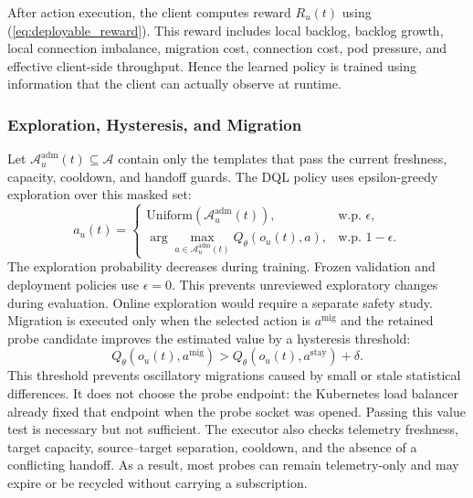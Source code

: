 \documentclass[manuscript]{acmart}
\begin{document}
After action execution, the client computes reward $R_u(t)$ using
(\ref{eq:deployable_reward}). This reward includes local backlog, backlog
growth, local connection imbalance, migration cost, connection cost, pod
pressure, and effective client-side throughput. Hence the learned policy is
trained using information that the client can actually observe at runtime.

\subsubsection{Exploration, Hysteresis, and Migration}

Let $\mathcal{A}^{\mathrm{adm}}_u(t)\subseteq\mathcal{A}$ contain only the templates
that pass the current freshness, capacity, cooldown, and handoff guards. The
DQL policy uses epsilon-greedy exploration over this masked set:
\begin{equation}
	a_u(t)=
	\begin{cases}
		\text{Uniform}(\mathcal{A}^{\mathrm{adm}}_u(t)), & \text{w.p. } \epsilon,\\
		\arg\max_{a\in\mathcal{A}^{\mathrm{adm}}_u(t)} Q_\theta(o_u(t),a), & \text{w.p. } 1-\epsilon.
	\end{cases}
\end{equation}
The exploration probability decreases during training. Frozen validation and
deployment policies use $\epsilon=0$. This prevents unreviewed exploratory
changes during evaluation. Online exploration would require a separate
safety study. Migration is
executed only when the selected action is $a^{\mathrm{mig}}$ and the retained probe
candidate improves the estimated value by a hysteresis threshold:
\begin{equation}
	Q_\theta(o_u(t),a^{\mathrm{mig}}) >
	Q_\theta(o_u(t),a^{\mathrm{stay}})+\delta.
\end{equation}
This threshold prevents oscillatory migrations caused by small or stale
statistical differences. It does not choose the probe endpoint: the Kubernetes
load balancer already fixed that endpoint when the probe socket was opened.
Passing this value test is necessary but not sufficient. The executor also
checks telemetry freshness, target capacity, source--target separation, cooldown,
and the absence of a conflicting handoff. As a result, most probes
can remain telemetry-only and may expire or be recycled without carrying a
subscription.
\end{document}
